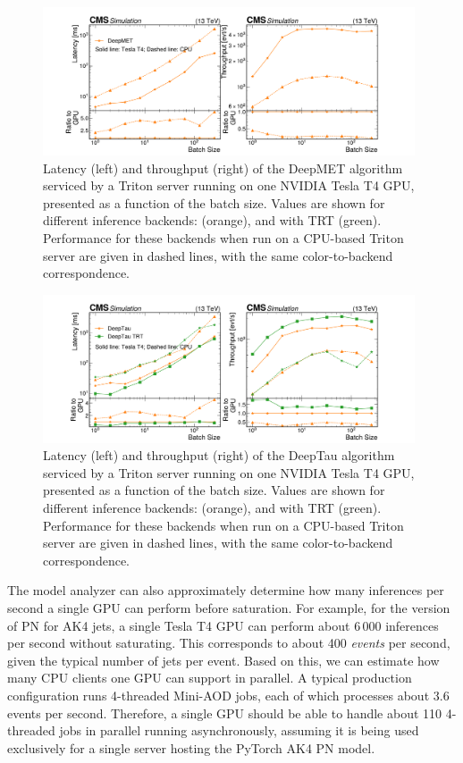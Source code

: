\begin{figure}[ht]
    \centering
    \includegraphics[width=0.98\textwidth]{plots/latencies_throughputs_deepmet.pdf}
    \caption{Latency (left) and throughput (right) of the DeepMET algorithm serviced by a Triton server running on one NVIDIA Tesla T4 GPU, presented as a function of the batch size. Values are shown for different inference backends: \TENSORFLOW (orange), and \TENSORFLOW with TRT (green). Performance for these backends when run on a CPU-based Triton server are given in dashed lines, with the same color-to-backend correspondence.}%
    \label{fig:throughputs_deepmet}
\end{figure}

\begin{figure}[ht]
    \centering
    \includegraphics[width=0.98\textwidth]{plots/latencies_throughputs_deeptau.pdf}
    \caption{Latency (left) and throughput (right) of the DeepTau algorithm serviced by a Triton server running on one NVIDIA Tesla T4 GPU, presented as a function of the batch size. Values are shown for different inference backends: \TENSORFLOW (orange), and \TENSORFLOW with TRT (green). Performance for these backends when run on a CPU-based Triton server are given in dashed lines, with the same color-to-backend correspondence.}%
    \label{fig:throughputs_deeptau}
\end{figure}

The model analyzer can also approximately determine how many inferences per second a single GPU can perform before saturation. For example, for the \PYTORCH version of PN for AK4 jets, a single Tesla T4 GPU can perform about 6\,000 inferences per second without saturating. This corresponds to about 400 \textit{events} per second, given the typical number of jets per event.
Based on this, we can estimate how many CPU clients one GPU can support in parallel. A typical production configuration runs 4-threaded Mini-AOD jobs, each of which processes about 3.6 events per second. Therefore, a single GPU should be able to handle about 110 4-threaded jobs in parallel running asynchronously, assuming it is being used exclusively for a single server hosting the PyTorch AK4 PN model.

